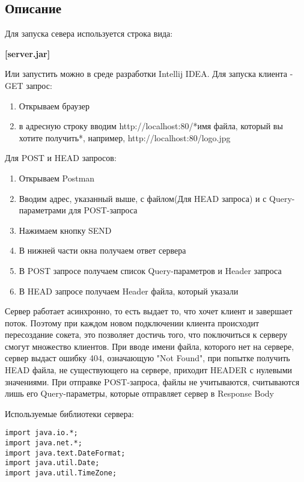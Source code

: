 \documentclass[a4paper,12pt]{extarticle}
\begin{document}
\subsection{Описание}
Для запуска севера используется строка вида:
\begin{center}\large\textbf{[server.jar]}\end{center}
Или запустить можно в среде разработки Intellij IDEA.
\newline
Для запуска клиента - GET запрос:
\begin{enumerate}
\item Открываем браузер
\item в адресную строку вводим http://localhost:80/*имя файла, который вы хотите получить*, например, http://localhost:80/logo.jpg
\end{enumerate}
Для POST и HEAD запросов:
\begin{enumerate}
\item Открываем Postman
\item Вводим адрес, указанный выше, с файлом(Для HEAD запроса) и с Query-параметрами для POST-запроса
\item Нажимаем кнопку SEND
\item В нижней части окна получаем ответ сервера
\item В POST запросе получаем список Query-параметров и Header запроса
\item В HEAD запросе получаем Header файла, который указали
\end{enumerate}
Сервер работает асинхронно, то есть выдает то, что хочет клиент и завершает поток. Поэтому при каждом новом подключении клиента происходит пересоздание сокета, это позволяет достичь того, что поключиться к серверу смогут множество клиентов. При вводе имени файла, которого нет на сервере, сервер выдаст ошибку 404, означающую "Not Found", при попытке получить HEAD файла, не существующего на сервере, приходит HEADER с нулевыми значениями. При отправке POST-запроса, файлы не учитываются, считываются лишь его Query-параметры, которые отправляет сервер в Response Body

Используемые библиотеки сервера:
\begin{verbatim}
import java.io.*;
import java.net.*;
import java.text.DateFormat;
import java.util.Date;
import java.util.TimeZone;
\end{verbatim}
\end{document}
